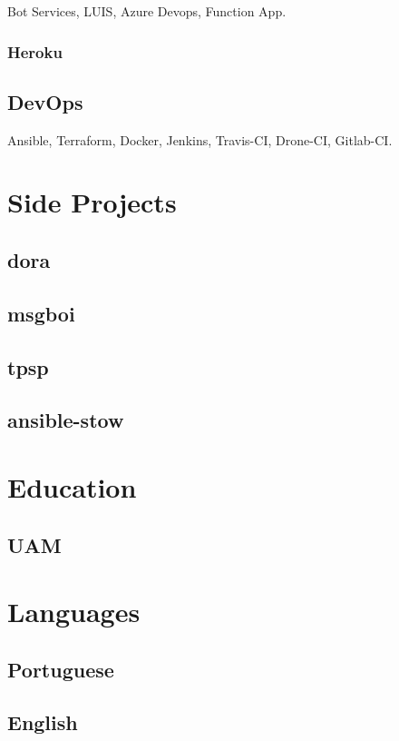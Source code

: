 \documentclass{article}
\begin{document}
Bot Services, LUIS, Azure Devops, Function App.

\subsubsection{Heroku}


\subsection{DevOps}

Ansible, Terraform, Docker, Jenkins, Travis-CI, Drone-CI, Gitlab-CI.



\section{Side Projects}

\subsection{dora}
\subsection{msgboi}
\subsection{tpsp}
\subsection{ansible-stow}



\section{Education}

\subsection{UAM}



\section{Languages}

\subsection{Portuguese}
\subsection{English}
\end{document}
